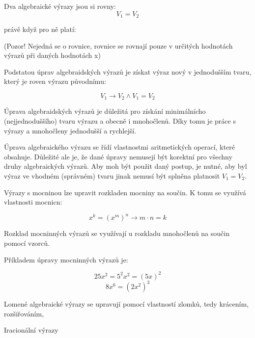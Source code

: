 
Dva algebraické výrazy jsou si rovny:
$$ V_1 = V_2 $$

právě když pro ně platí:

\vskip 4mm
\vskip 4mm

(Pozor! Nejedná se o rovnice, rovnice se rovnají pouze v určitých hodnotách výrazů při daných hodnotách x)


Podstatou úprav algebraidských výrazů je získat výraz nový v jednodušším tvaru, který je roven výrazu původnímu:

$$ V_1 \rightarrow V_2 \wedge V_1 = V_2 $$

Úprava algebraidských výrazů je důležitá pro získání minimálnícho (nejjednoduššího) tvaru výrazu a obecně i mnohočlenů. Díky tomu je práce s výrazy a mnohočleny jednodušší a rychlejší. 

Úprava algebraického výrazu se řídí vlastnostmi aritmetických operací, které obsahuje. Důležité ale je, že dané úpravy nemusejí být korektní pro všechny druhy algebraických výrazů. Aby moh být použit daný postup, je nutné, aby byl výraz ve vhodném (správném) tvaru jinak nemusí být splněna platnosit $V_1 = V_2$. 


Výrazy s mocninou lze upravit rozkladen mocniny na součin. K tomu se využívá vlastnosti mocnicn:

$$ x^k =  (x^m)^n \rightarrow m\cdot n = k $$

Rozklad mocninných výrazů se využívají u rozkladu mnohočlenů na součin pomocí vzorců.

Příkladem úpravy mocninných výrazů je:

$$ 25x^2 = 5^2x^2 =(5x)^2 $$
$$ 8x^6 = (2x^2)^3 $$


Lomené algebraické výrazy se upravují pomocí vlastností zlomků, tedy krácením, rozšiřováním, 


Iracionální výrazy 




